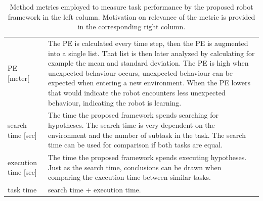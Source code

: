 \noindent
\begin{table}[H]
\caption{Method metrics employed to measure task performance by the proposed robot framework in the left column. Motivation on relevance of the metric is provided in the corresponding right column.}\label{table:proposed_method_metrics}
\centering
\begin{tabular}%
  {>{\raggedright\arraybackslash}p{}%
   >{\raggedright\arraybackslash}p{}}
\acl{PE} [meter[ & The \ac{PE} is calculated every time step, then the \ac{PE} is augmented into a single list. That list is then later analyzed by calculating for example the mean and standard deviation. The \ac{PE} is high when unexpected behaviour occurs, unexpected behaviour can be expected when entering a new environment. When the \ac{PE} lowers that would indicate the robot encounters less unexpected behaviour, indicating the robot is learning.\\
search time [sec]& The time the proposed framework spends searching for hypotheses. The search time is very dependent on the environment and the number of subtask in the task. The search time can be used for comparison if both tasks are equal.\\ 
execution time [sec] & The time the proposed framework spends executing hypotheses. Just as the search time, conclusions can be drawn when comparing the execution time between similar tasks.\\ 
task time & search time + execution time. \\
\end{tabular}
\end{table}

